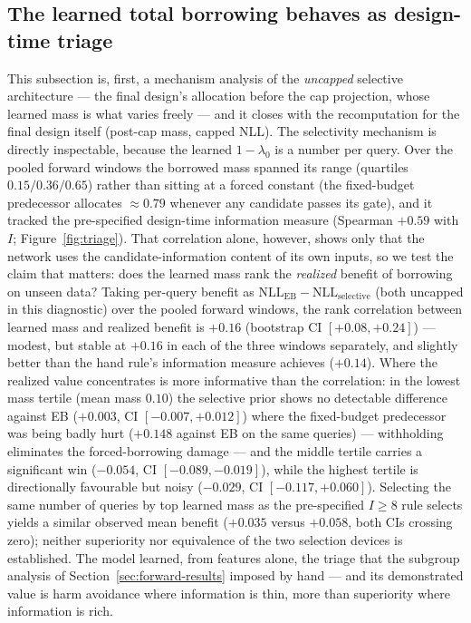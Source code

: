 \documentclass[11pt]{article}
\newcommand{\lamz}{\lambda_{0}}
\begin{document}
\subsection{The learned total borrowing behaves as design-time triage}
\label{sec:triage-results}
This subsection is, first, a mechanism analysis of the \emph{uncapped}
selective architecture --- the final design's allocation before the cap
projection, whose learned mass is what varies freely --- and it closes
with the recomputation for the final design itself (post-cap mass,
capped NLL). The selectivity mechanism is directly inspectable, because the learned
$1-\lamz$ is a number per query. Over the pooled forward windows the borrowed
mass spanned its range (quartiles $0.15/0.36/0.65$) rather than sitting at a
forced constant (the fixed-budget predecessor allocates $\approx 0.79$
whenever any candidate passes its gate), and it tracked the pre-specified
design-time information measure (Spearman $+0.59$ with $I$;
Figure~\ref{fig:triage}). That correlation alone, however, shows only that
the network uses the candidate-information content of its own inputs, so we
test the claim that matters: does the learned mass rank the \emph{realized}
benefit of borrowing on unseen data? Taking per-query benefit as
$\mathrm{NLL}_{\mathrm{EB}} - \mathrm{NLL}_{\mathrm{selective}}$ (both
uncapped in this diagnostic) over the
pooled forward windows, the rank correlation between learned mass and
realized benefit is $+0.16$ (bootstrap CI $[+0.08, +0.24]$) --- modest, but
stable at $+0.16$ in each of the three windows separately, and slightly
better than the hand rule's information measure achieves ($+0.14$).
Where the realized value concentrates is more informative than the
correlation: in the lowest mass tertile (mean mass $0.10$) the selective
prior shows no detectable difference against EB ($+0.003$, CI $[-0.007,+0.012]$) where
the fixed-budget predecessor was being badly hurt ($+0.148$ against EB on the
same queries) --- withholding eliminates the forced-borrowing damage --- and
the middle tertile carries a significant win ($-0.054$, CI
$[-0.089,-0.019]$), while the highest tertile is directionally favourable
but noisy ($-0.029$, CI $[-0.117,+0.060]$). Selecting the same number of
queries by top learned mass as the pre-specified $I \ge 8$ rule selects
yields a similar observed mean benefit ($+0.035$ versus $+0.058$, both
CIs
crossing zero); neither superiority nor equivalence of the two
selection devices is established. The model learned, from features alone, the
triage that the subgroup analysis of Section~\ref{sec:forward-results}
imposed by hand --- and its demonstrated value is harm avoidance where
information is thin, more than superiority where information is rich.
\end{document}

